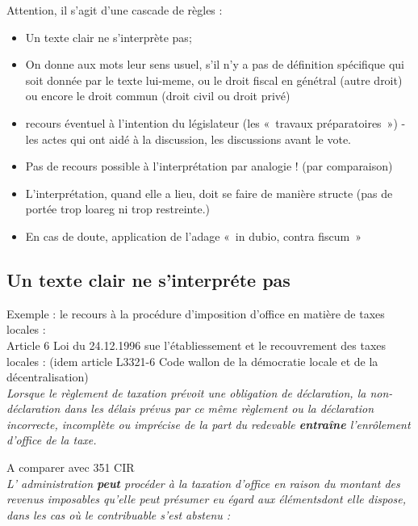 \documentclass{book}
\begin{document}
Attention, il s'agit d'une cascade de règles :\\

\begin{itemize}
\item Un texte clair ne s'interprète pas;
\item On donne aux mots leur sens usuel, s'il n'y a pas de définition spécifique qui soit donnée par le texte lui-meme, ou le droit fiscal en génétral (autre droit) ou encore le droit commun (droit civil ou droit privé)
\item recours éventuel à l'intention du législateur (les «~travaux préparatoires~») - les actes qui ont aidé à la discussion, les discussions avant le vote.
\item Pas de recours possible à l'interprétation par analogie ! (par comparaison)
\item L'interprétation, quand elle a lieu, doit se faire de manière structe (pas de portée trop loareg ni trop restreinte.)
\item En cas de doute, application de l'adage «~in dubio, contra fiscum~»
\end{itemize}

\subsection{Un texte clair ne s'interpréte pas}

Exemple : le recours à la procédure d'imposition d'office en matière de taxes locales :\\

Article 6 Loi du 24.12.1996 sue l'établiessement et le recouvrement des taxes locales : (idem article L3321-6 Code wallon de la démocratie locale et de la décentralisation)\\

\textit{Lorsque le règlement de taxation prévoit une obligation de déclaration, la non-déclaration dans
les délais prévus par ce même règlement ou la déclaration incorrecte, incomplète ou imprécise de la part du
redevable \textbf{entraîne} l’enrôlement d’office de la taxe.}

\null

A comparer avec 351 CIR\\

\textit{L' administration \textbf{peut} procéder à la taxation d'office en raison du montant des revenus imposables qu'elle peut présumer eu égard aux élémentsdont elle dispose, dans les cas où le contribuable s'est abstenu :}
   
\end{document}
